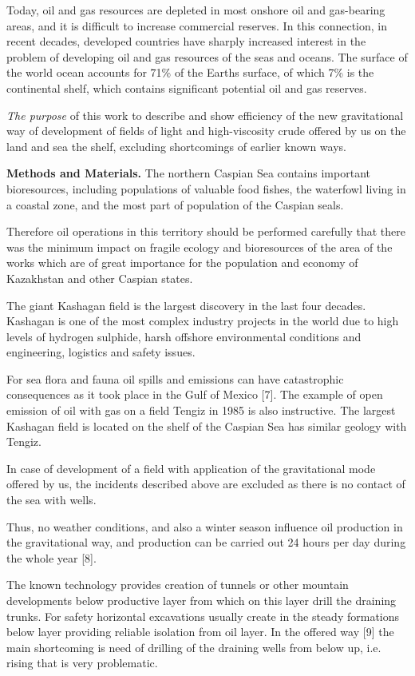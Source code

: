 \begin{multicols}{2}
Today, oil and gas resources are depleted in most onshore oil and
gas-bearing areas, and it is difficult to increase commercial reserves.
In this connection, in recent decades, developed countries have sharply
increased interest in the problem of developing oil and gas resources of
the seas and oceans. The surface of the world ocean accounts for 71\% of
the Earth\textquotesingle s surface, of which 7\% is the continental
shelf, which contains significant potential oil and gas reserves.

\emph{The purpose} of this work to describe and show efficiency of the
new gravitational way of development of fields of light and
high-viscosity crude offered by us on the land and sea the shelf,
excluding shortcomings of earlier known ways.

{\bfseries Methods and Materials.} The northern Caspian Sea contains
important bioresources, including populations of valuable food fishes,
the waterfowl living in a coastal zone, and the most part of population
of the Caspian seals.

Therefore oil operations in this territory should be performed carefully
that there was the minimum impact on fragile ecology and bioresources of
the area of the works which are of great importance for the population
and economy of Kazakhstan and other Caspian states.

The giant Kashagan field is the largest discovery in the last four
decades. Kashagan is one of the most complex industry projects in the
world due to high levels of hydrogen sulphide, harsh offshore
environmental conditions and engineering, logistics and safety issues.

For sea flora and fauna oil spills and emissions can have catastrophic
consequences as it took place in the Gulf of Mexico {[}7{]}. The example
of open emission of oil with gas on a field Tengiz in 1985 is also
instructive. The largest Kashagan field is located on the shelf of the
Caspian Sea has similar geology with Tengiz.

In case of development of a field with application of the gravitational
mode offered by us, the incidents described above are excluded as there
is no contact of the sea with wells.

Thus, no weather conditions, and also a winter season influence oil
production in the gravitational way, and production can be carried out
24 hours per day during the whole year {[}8{]}.

The known technology provides creation of tunnels or other mountain
developments below productive layer from which on this layer drill the
draining trunks. For safety horizontal excavations usually create in the
steady formations below layer providing reliable isolation from oil
layer. In the offered way {[}9{]} the main shortcoming is need of
drilling of the draining wells from below up, i.e. rising that is very
problematic.


\end{multicols}
